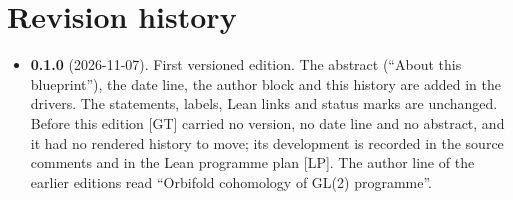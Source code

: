 \appendix
\chapter{Revision history}\label{app:gt-history}

\begin{itemize}
\item \textbf{0.1.0} (2026-11-07). First versioned edition. The abstract (``About this blueprint''), the date line,
  the author block and this history are added in the drivers. The statements, labels, Lean links and status marks are
  unchanged. Before this edition [GT] carried no version, no date line and no abstract, and it had no rendered history
  to move; its development is recorded in the source comments and in the Lean programme plan [LP]. The author line
  of the earlier editions read ``Orbifold cohomology of GL(2) programme''.
\end{itemize}
